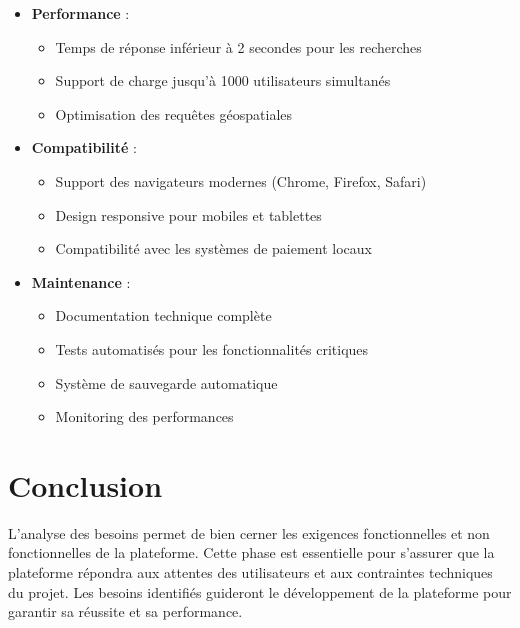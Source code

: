 \begin{itemize}
    \item \textbf{Performance} :
    \begin{itemize}
        \item Temps de réponse inférieur à 2 secondes pour les recherches
        \item Support de charge jusqu'à 1000 utilisateurs simultanés
        \item Optimisation des requêtes géospatiales
    \end{itemize}
    
    \item \textbf{Compatibilité} :
    \begin{itemize}
        \item Support des navigateurs modernes (Chrome, Firefox, Safari)
        \item Design responsive pour mobiles et tablettes
        \item Compatibilité avec les systèmes de paiement locaux
    \end{itemize}
    
    \item \textbf{Maintenance} :
    \begin{itemize}
        \item Documentation technique complète
        \item Tests automatisés pour les fonctionnalités critiques
        \item Système de sauvegarde automatique
        \item Monitoring des performances
    \end{itemize}
\end{itemize}

\section{Conclusion}
L'analyse des besoins permet de bien cerner les exigences fonctionnelles et non fonctionnelles de la plateforme. Cette phase est essentielle pour s’assurer que la plateforme répondra aux attentes des utilisateurs et aux contraintes techniques du projet. Les besoins identifiés guideront le développement de la plateforme pour garantir sa réussite et sa performance.
